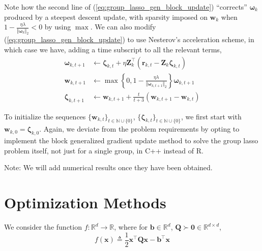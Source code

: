 \documentclass{article}
\numberwithin{equation}{section}
\begin{document}
Note how the second line of (\ref{eq:group_lasso_gen_block_update})
``corrects'' $ \boldsymbol{\omega}_k $ produced by a steepest descent update,
with sparsity imposed on $ \mathbf{w}_k $ when
$ 1 - \frac{\eta\lambda}{\Vert\boldsymbol{\omega}_k\Vert_2} < 0 $ by using
$ \max $. We can also modify (\ref{eq:group_lasso_gen_block_update}) to use
Nesterov's acceleration scheme, in which case we have, adding a time
subscript to all the relevant terms,
\begin{equation} \label{eq:group_lasso_gen_block_nesterov_update}
    \begin{split}
        \boldsymbol{\omega}_{k, t + 1} &
        \leftarrow
        \boldsymbol{\zeta}_{k, t} + \eta\mathbf{Z}_k^\top(\mathbf{r}_{k, t} -
        \mathbf{Z}_k\boldsymbol{\zeta}_{k, t}) \\
        \mathbf{w}_{k, t + 1} &
        \leftarrow
        \max\left\{
        0,
        1 - \frac{\eta\lambda}{\Vert\boldsymbol{\omega}_{k, t + 1}\Vert_2}
        \right\}
        \boldsymbol{\omega}_{k, t + 1} \\
        \boldsymbol{\zeta}_{k, t + 1} &
        \leftarrow
        \mathbf{w}_{k, t + 1} + \frac{t}{t + 3}(\mathbf{w}_{k, t + 1} -
        \mathbf{w}_{k, t})
    \end{split}
\end{equation}

To initialize the sequences
$ \{\mathbf{w}_{k, t}\}_{t \in \mathbb{N} \cup \{0\}} $,
$ \{\boldsymbol{\zeta}_{k, t}\}_{t \in \mathbb{N} \cup \{0\}} $, we first
start with $ \mathbf{w}_{k, 0} = \boldsymbol{\zeta}_{k, 0} $. Again, we
deviate from the problem requirements by opting to implement the block
generalized gradient update method to solve the group lasso problem itself,
not just for a single group, in C++ instead of R.

\medskip

Note: We will add numerical results once they have been obtained.

\section{Optimization Methods}


We consider the function $ f : \mathbb{R}^d \rightarrow \mathbb{R} $, where
for $ \mathbf{b} \in \mathbb{R}^d $, $ \mathbf{Q} \succ \mathbf{0} \in
\mathbb{R}^{d \times d} $,
\begin{equation} \label{eq:5.1.1}
    f(\mathbf{x}) \triangleq
    \frac{1}{2}\mathbf{x}^\top\mathbf{Qx} - \mathbf{b}^\top\mathbf{x}
\end{equation}
\end{document}
